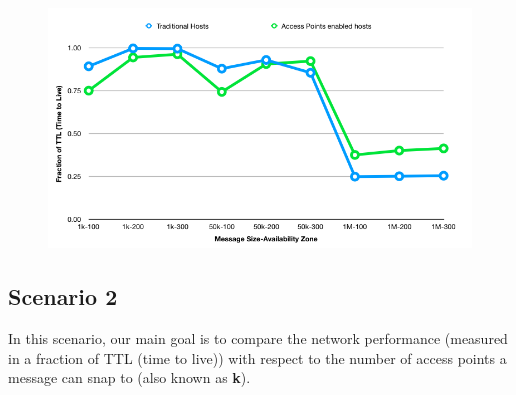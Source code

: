 {\begin{figure}[H]
  \label{fig:scenario1_message_size_availability_zone_1}
\end{figure}
\begin{figure}[H]
  \centering
  \includegraphics[scale=0.55]{./figures/scenario1_message_size_availability_zone_2}
  \label{fig:scenario1_message_size_availability_zone_2}
\end{figure}
\vspace{4mm}
\subsection{Scenario 2}
In this scenario, our main goal is to compare the network performance (measured in a fraction of TTL (time to live)) with respect to the number of access points a message can snap to (also known as \textbf{k}).
}
